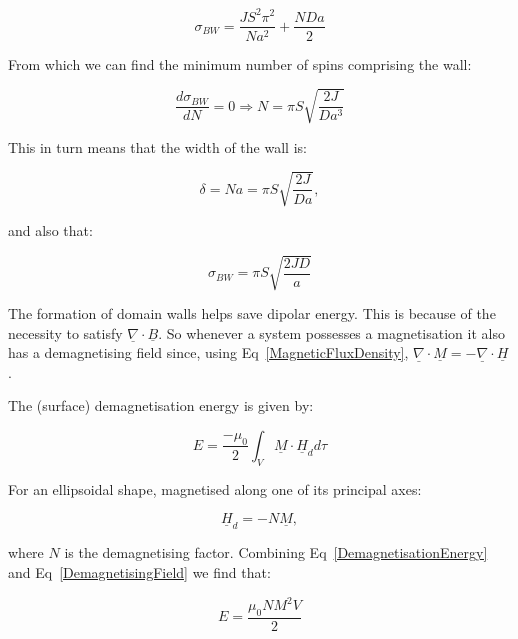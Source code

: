 \begin{equation}
    \sigma_{BW} = \frac{JS^2\pi^2}{Na^2} + \frac{NDa}{2}
    \label{FinalEnergyUnitAreaBlochWallExpression}
\end{equation}

\noindent From which we can find the minimum number of spins comprising the wall:

\begin{equation}
    \frac{d \sigma_{BW}}{dN} = 0 \Rightarrow N = \pi S \sqrt{\frac{2J}{Da^3}
    }
    \label{NumberSpinsBlochWall}
\end{equation}

\noindent This in turn means that the width of the wall is:

\begin{equation}
    \delta = Na = \pi S \sqrt{\frac{2J}{Da}},
    \label{BlochWallWidth}
\end{equation}

\noindent and also that:

\begin{equation}
    \sigma_{BW} = \pi S \sqrt{\frac{2JD}{a}}
    \label{FinalEnergyUnitAreaBlochWall}
\end{equation}

\noindent The formation of domain walls helps save dipolar energy. This is because of the necessity to satisfy $\underline{\nabla} \cdot \underline{B}$. So whenever a system possesses a magnetisation it also has a demagnetising field since, using Eq~\ref{MagneticFluxDensity}, $\underline{\nabla} \cdot \underline{M} = - \underline{\nabla} \cdot \underline{H}$.

\noindent The (surface) demagnetisation energy is given by:

\begin{equation}
    E = \frac{-\mu_0}{2} \int_V \underline{M} \cdot \underline{H}_d d\tau
    \label{DemagnetisationEnergy}
\end{equation}

\noindent For an ellipsoidal shape, magnetised along one of its principal axes:

\begin{equation}
    \underline{H}_d = - N\underline{M},
    \label{DemagnetisingField}
\end{equation}

\noindent where $N$ is the demagnetising factor. Combining Eq~\ref{DemagnetisationEnergy} and Eq~\ref{DemagnetisingField} we find that:

\begin{equation}
    E = \frac{\mu_0 N M^2 V}{2}
    \label{TotalDemagnetisationEnergy}
\end{equation}

